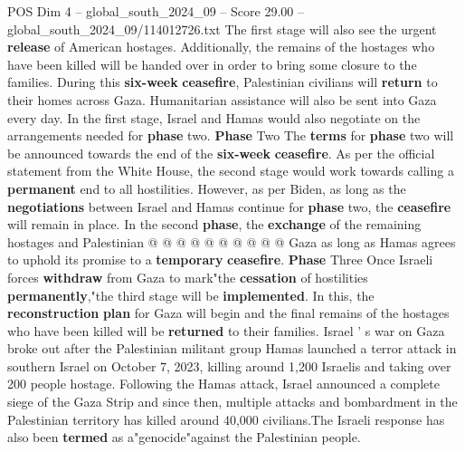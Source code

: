 \begin{textsample}{POS Dim 4 – global\_south\_2024\_09 – Score 29.00 – global\_south\_2024\_09/114012726.txt}
The first stage will also see the urgent \textbf{release} of American hostages.
Additionally, the remains of the hostages who have been killed will be handed over in order to bring some closure to the families.
During this \textbf{six-week} \textbf{ceasefire}, Palestinian civilians will \textbf{return} to their homes across Gaza.
Humanitarian assistance will also be sent into Gaza every day.
In the first stage, Israel and Hamas would also negotiate on the arrangements needed for \textbf{phase} two. \textbf{Phase} Two The \textbf{terms} for \textbf{phase} two will be announced towards the end of the \textbf{six-week} \textbf{ceasefire}.
As per the official statement from the White House, the second stage would work towards calling a \textbf{permanent} end to all hostilities.
However, as per Biden, as long as the \textbf{negotiations} between Israel and Hamas continue for \textbf{phase} two, the \textbf{ceasefire} will remain in place.
In the second \textbf{phase}, the \textbf{exchange} of the remaining hostages and Palestinian @ @ @ @ @ @ @ @ @ @ Gaza as long as Hamas agrees to uphold its promise to a \textbf{temporary} \textbf{ceasefire}. \textbf{Phase} Three Once Israeli forces \textbf{withdraw} from Gaza to mark"the \textbf{cessation} of hostilities \textbf{permanently},"the third stage will be \textbf{implemented}.
In this, the \textbf{reconstruction} \textbf{plan} for Gaza will begin and the final remains of the hostages who have been killed will be \textbf{returned} to their families.
Israel ' s war on Gaza broke out after the Palestinian militant group Hamas launched a terror attack in southern Israel on October 7, 2023, killing around 1,200 Israelis and taking over 200 people hostage.
Following the Hamas attack, Israel announced a complete siege of the Gaza Strip and since then, multiple attacks and bombardment in the Palestinian territory has killed around 40,000 civilians.The Israeli response has also been \textbf{termed} as a"genocide"against the Palestinian people.

\end{textsample}
